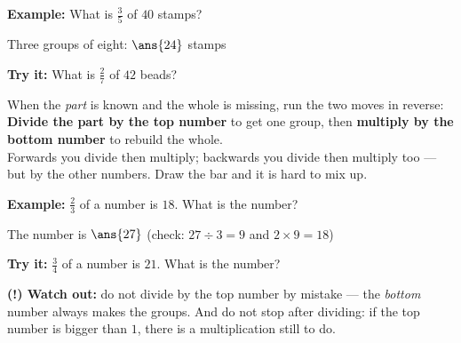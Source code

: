 \documentclass[12pt]{article}
\begin{document}
\begin{examplebox}
\textbf{Example:} \quad What is $\frac{3}{5}$ of $40$ stamps?
\begin{center}
\end{center}

Three groups of eight: $\ans{24}$ stamps
\end{examplebox}

\begin{tryitbox}
\textbf{Try it:} \quad What is $\frac{2}{7}$ of $42$ beads?\\[2pt]
\end{tryitbox}


\begin{formulabox}
When the \emph{part} is known and the whole is missing, run the two moves in
reverse:\\[3pt]
\textbf{Divide the part by the top number} to get one group, then
\textbf{multiply by the bottom number} to rebuild the whole.\\[2pt]
Forwards you divide then multiply; backwards you divide then multiply
too --- but by the other numbers. Draw the bar and it is hard to mix up.
\end{formulabox}

\begin{examplebox}
\textbf{Example:} \quad $\frac{2}{3}$ of a number is $18$. What is the number?

The number is $\ans{27}$ \quad (check: $27 \div 3 = 9$ and
$2 \times 9 = 18$)
\end{examplebox}

\begin{tryitbox}
\textbf{Try it:} \quad $\frac{3}{4}$ of a number is $21$. What is the
number?\\[2pt]
\end{tryitbox}

\begin{watchoutbox}
\textbf{(!) Watch out:} do not divide by the top number by mistake --- the
\emph{bottom} number always makes the groups. And do not stop after dividing:
if the top number is bigger than $1$, there is a multiplication still to do.
\end{watchoutbox}
\end{document}
